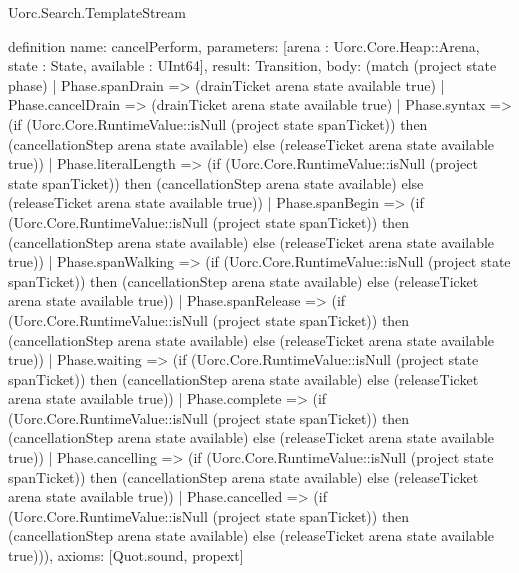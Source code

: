 \begin{lexlean}{Uorc.Search.TemplateStream}
\begin{semanticmodule}
definition{
  name: cancelPerform,
  parameters: [arena : Uorc.Core.Heap::Arena, state : State, available : UInt64],
  result: Transition,
  body: (match (project state phase)
    | Phase.spanDrain => (drainTicket arena state available true)
    | Phase.cancelDrain => (drainTicket arena state available true)
    | Phase.syntax => (if (Uorc.Core.RuntimeValue::isNull (project state spanTicket)) then (cancellationStep arena state available) else (releaseTicket arena state available true))
    | Phase.literalLength => (if (Uorc.Core.RuntimeValue::isNull (project state spanTicket)) then (cancellationStep arena state available) else (releaseTicket arena state available true))
    | Phase.spanBegin => (if (Uorc.Core.RuntimeValue::isNull (project state spanTicket)) then (cancellationStep arena state available) else (releaseTicket arena state available true))
    | Phase.spanWalking => (if (Uorc.Core.RuntimeValue::isNull (project state spanTicket)) then (cancellationStep arena state available) else (releaseTicket arena state available true))
    | Phase.spanRelease => (if (Uorc.Core.RuntimeValue::isNull (project state spanTicket)) then (cancellationStep arena state available) else (releaseTicket arena state available true))
    | Phase.waiting => (if (Uorc.Core.RuntimeValue::isNull (project state spanTicket)) then (cancellationStep arena state available) else (releaseTicket arena state available true))
    | Phase.complete => (if (Uorc.Core.RuntimeValue::isNull (project state spanTicket)) then (cancellationStep arena state available) else (releaseTicket arena state available true))
    | Phase.cancelling => (if (Uorc.Core.RuntimeValue::isNull (project state spanTicket)) then (cancellationStep arena state available) else (releaseTicket arena state available true))
    | Phase.cancelled => (if (Uorc.Core.RuntimeValue::isNull (project state spanTicket)) then (cancellationStep arena state available) else (releaseTicket arena state available true))),
  axioms: [Quot.sound, propext]
}


\end{semanticmodule}
\end{lexlean}
